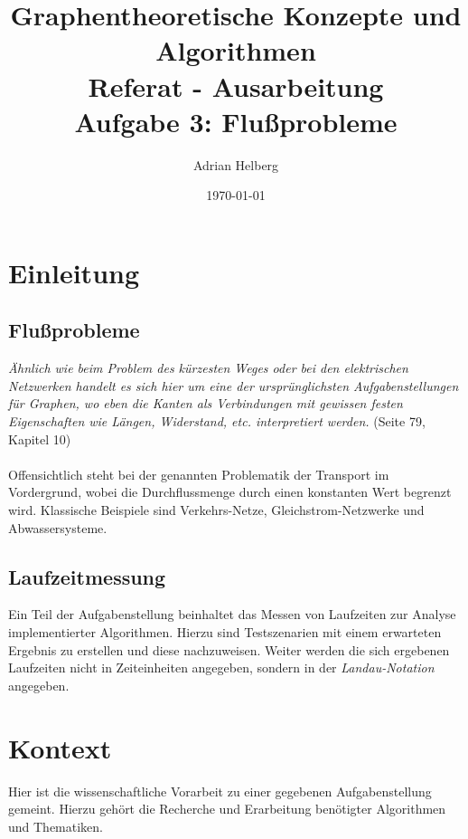 \documentclass[11pt]{article}
\title{
\Large Graphentheoretische Konzepte und Algorithmen\\
\huge Referat - Ausarbeitung\\
\Large Aufgabe 3: Flu\ss{}probleme\\[0.3in]
}
\author{Adrian Helberg\\}
\date{\today}
\begin{document}
\maketitle
\newpage
\tableofcontents

\newpage

\section{Einleitung}

\subsection{Flu\ss{}probleme}
\textit{\"Ahnlich wie beim Problem des k\"urzesten Weges oder bei den elektrischen Netzwerken handelt es sich hier um eine der urspr\"unglichsten Aufgabenstellungen f\"ur Graphen, wo eben die Kanten als Verbindungen mit gewissen festen Eigenschaften wie L\"angen, Widerstand, etc. interpretiert werden.} \cite{alggra} (Seite 79, Kapitel 10)\\~\\
Offensichtlich steht bei der genannten Problematik der Transport im Vordergrund, wobei die Durchflussmenge durch einen konstanten Wert begrenzt wird. Klassische Beispiele sind Verkehrs-Netze, Gleichstrom-Netzwerke und Abwassersysteme.

\subsection{Laufzeitmessung}
Ein Teil der Aufgabenstellung beinhaltet das Messen von Laufzeiten zur Analyse implementierter Algorithmen. Hierzu sind Testszenarien mit einem erwarteten Ergebnis zu erstellen und diese nachzuweisen. Weiter werden die sich ergebenen Laufzeiten nicht in Zeiteinheiten angegeben, sondern in der \textit{Landau-Notation} angegeben.

\section{Kontext}
Hier ist die wissenschaftliche Vorarbeit zu einer gegebenen Aufgabenstellung gemeint. Hierzu geh\"ort die Recherche und Erarbeitung ben\"otigter Algorithmen und Thematiken.
\end{document}
